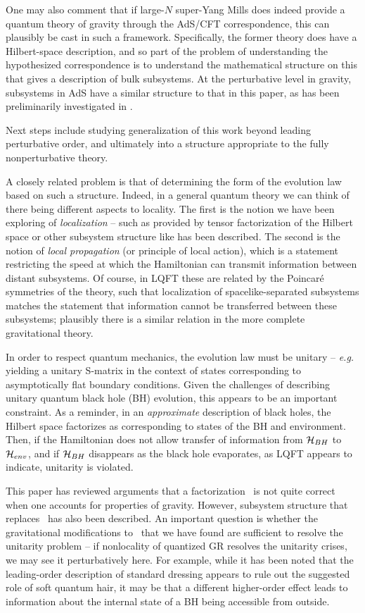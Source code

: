 One may also comment that if large-$N$ super-Yang Mills does indeed provide a quantum theory of gravity through the AdS/CFT correspondence, this can plausibly be cast in such a framework.  Specifically, the former theory does have a Hilbert-space description, and so part of the problem of understanding the hypothesized correspondence is to understand the mathematical structure on this that gives a description of bulk subsystems.  At the perturbative level in gravity, subsystems in AdS have a similar structure to that in this paper, as has been preliminarily investigated in .

Next steps include studying generalization of this work beyond leading perturbative order, and ultimately into a structure appropriate to the fully nonperturbative theory.  

A closely related problem is that of determining the form of the evolution law based on such a structure.  Indeed, in a general quantum theory we can think of there being different aspects to locality.  The first is the notion we have been exploring of {\it localization} -- such as provided by tensor factorization of the Hilbert space or other subsystem structure like has been described.  The second is the notion of {\it local propagation} (or principle of local action\Eins), which is a statement restricting  the speed at which the Hamiltonian can transmit information between distant subsystems.  Of course, in LQFT these are related by the Poincar\'e symmetries of the theory, such that localization of spacelike-separated subsystems matches the statement that information cannot be transferred between these subsystems; plausibly there is a similar relation in the more complete gravitational theory.  

In order to respect quantum mechanics, the evolution law must be unitary -- {\it e.g.} yielding a unitary S-matrix in the context of states corresponding to asymptotically flat boundary conditions.  Given the challenges of describing unitary quantum black hole (BH) evolution, this appears to be an important constraint.  As a reminder, in an {\it approximate} description of black holes, the Hilbert space factorizes as
%
\eqn{}
%
corresponding to states of the BH and environment.  Then, if the Hamiltonian does not allow transfer of information from ${\cal H}_{BH}$ to  ${\cal H}_{env}$, and if 
${\cal H}_{BH}$ disappears as the black hole evaporates, as LQFT appears to indicate,  unitarity is violated.

This paper has reviewed arguments that a factorization \bhprod\ is not quite correct when one accounts for properties of gravity.  However, subsystem structure that replaces \bhprod\ has also been described.  An important question is whether the gravitational modifications to \bhprod\ that we have found are sufficient to resolve the unitarity problem -- if nonlocality of quantized GR resolves the unitarity crises, we may see it perturbatively here.  For example, while it has been noted that the leading-order description of standard dressing appears to rule out the suggested role of soft quantum hair, it may be that a different higher-order effect leads to information about the internal state of a BH being accessible from outside.

